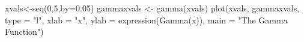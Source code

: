 \begin{Schunk}
\begin{Sinput}
 xvals<-seq(0,5,by=0.05)
 gammaxvals <- gamma(xvals)
 plot(xvals, gammaxvals, type = "l", xlab = "x", ylab = expression(Gamma(x)), main = "The Gamma Function")
\end{Sinput}
\end{Schunk}
